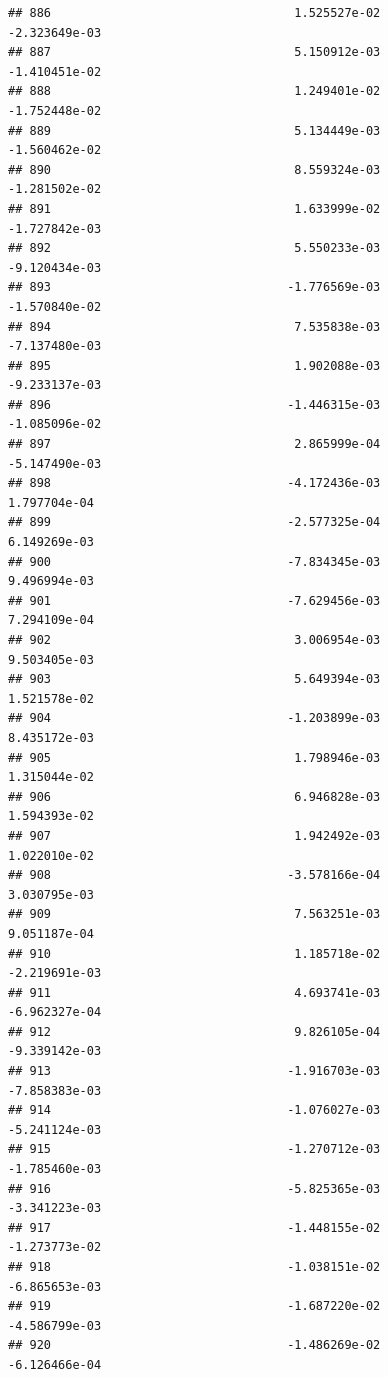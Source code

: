 \documentclass[
]{article}
\begin{document}
\begin{verbatim}
## 886                                  1.525527e-02          -2.323649e-03
## 887                                  5.150912e-03          -1.410451e-02
## 888                                  1.249401e-02          -1.752448e-02
## 889                                  5.134449e-03          -1.560462e-02
## 890                                  8.559324e-03          -1.281502e-02
## 891                                  1.633999e-02          -1.727842e-03
## 892                                  5.550233e-03          -9.120434e-03
## 893                                 -1.776569e-03          -1.570840e-02
## 894                                  7.535838e-03          -7.137480e-03
## 895                                  1.902088e-03          -9.233137e-03
## 896                                 -1.446315e-03          -1.085096e-02
## 897                                  2.865999e-04          -5.147490e-03
## 898                                 -4.172436e-03           1.797704e-04
## 899                                 -2.577325e-04           6.149269e-03
## 900                                 -7.834345e-03           9.496994e-03
## 901                                 -7.629456e-03           7.294109e-04
## 902                                  3.006954e-03           9.503405e-03
## 903                                  5.649394e-03           1.521578e-02
## 904                                 -1.203899e-03           8.435172e-03
## 905                                  1.798946e-03           1.315044e-02
## 906                                  6.946828e-03           1.594393e-02
## 907                                  1.942492e-03           1.022010e-02
## 908                                 -3.578166e-04           3.030795e-03
## 909                                  7.563251e-03           9.051187e-04
## 910                                  1.185718e-02          -2.219691e-03
## 911                                  4.693741e-03          -6.962327e-04
## 912                                  9.826105e-04          -9.339142e-03
## 913                                 -1.916703e-03          -7.858383e-03
## 914                                 -1.076027e-03          -5.241124e-03
## 915                                 -1.270712e-03          -1.785460e-03
## 916                                 -5.825365e-03          -3.341223e-03
## 917                                 -1.448155e-02          -1.273773e-02
## 918                                 -1.038151e-02          -6.865653e-03
## 919                                 -1.687220e-02          -4.586799e-03
## 920                                 -1.486269e-02          -6.126466e-04

\end{verbatim}
\end{document}
